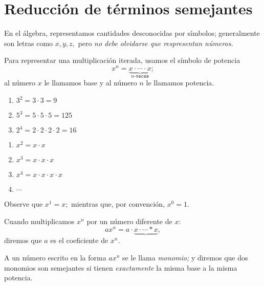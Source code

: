 
\section{Reducci\'on de t\'erminos semejantes}

 En el álgebra, representamos cantidades desconocidas por s\'imbolos;  generalmente son letras como $x,y,z,$ pero \emph{no debe olvidarse que respresentan números.}



	Para representar una multiplicaci\'on iterada, usamos el s\'imbolo de potencia
	$$
	x^{n}=\underbrace{x\cdot\cdots \cdot x}_{n\texttt{-veces}};
	$$
	al número $x$ le llamamos base y al número $n$ le llamamos potencia.



	\begin{problema}
		\begin{enumerate}
			\item $3^{2}=3\cdot3=9$
			\item $5^{3}=5\cdot5\cdot5=125$
			\item $2^{4}=2\cdot2\cdot2\cdot2=16$
		\end{enumerate}
		
	\end{problema}
	



	\begin{problema}
		\begin{enumerate}
			\item $x^{2}=x\cdot x$
			\item $x^{3}=x\cdot x\cdot x$
			\item $x^{4}=x\cdot x\cdot x\cdot x$
			\item $\cdots$
		\end{enumerate}
		
	\end{problema}




	\begin{rem}
		Observe que $x^{1}=x;$ mientras que, por convenci\'on, $x^{0}=1.$
	\end{rem}
	



	Cuando multiplicamos $x^{n}$ por un número diferente de $x:$
	$$ax^{n}=a\cdot\underbrace{x\cdot\cdots *x},$$ diremos que $a$ es el coeficiente de $x^{n}.$ 



	A un número escrito en la forma $ax^{n}$ se le llama \emph{monomio;} y diremos que dos monomios son semejantes si tienen \emph{exactamente} la misma base a la misma potencia.



